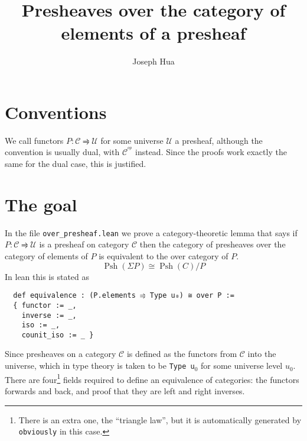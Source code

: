 \documentclass{article}
\DeclareMathOperator{\PSh}{Psh}
\newcommand{\functor}{\rightrightharpoons}
\newcommand{\CC}{\mathcal{C}}
\newcommand{\UU}{\mathcal{U}}
\newcommand{\op}{^{op}}
\newcommand{\iso}{\cong}
\newcommand{\<}{\langle}
\renewcommand{\>}{\rangle}
\theoremstyle{definitionstyle}
\theoremstyle{exercisestyle}
\theoremstyle{remarkstyle}
\begin{document}
\title{Presheaves over the category of elements of a presheaf}
\author{Joseph Hua}
\maketitle

\section{Conventions}

We call functors $P : \CC \functor \UU$ for some universe $\UU$
a presheaf, although the convention is usually dual, with $\CC^{\op}$ instead.
Since the proofs work exactly the same for the dual case, this is justified.

\section{The goal}

In the file \texttt{over\_presheaf.lean} we prove a category-theoretic lemma
that says if $P : \CC \functor \UU$ is a presheaf on category $\CC$ then
the category of presheaves over the category of elements of $P$ is equivalent
to the over category of $P$.
\[ \PSh(\Sigma P) \iso \PSh(C) / P \]
In lean this is stated as

\begin{lstlisting}
  def equivalence : (P.elements ⥤ Type u₀) ≅ over P :=
  { functor := _,
    inverse := _,
    iso := _,
    counit_iso := _ } \end{lstlisting}

Since presheaves on a category $\CC$ is defined as the functors
from $\CC$ into the universe, which in type theory is taken to be
\texttt{Type u}$_{0}$ for some universe level $u_{0}$.
There are four\footnote{There is an extra one, the ``triangle law'',
  but it is automatically generated by \texttt{obviously} in this case.}
fields required to define an equivalence of
categories: the functors forwards and back, and proof that they are left and
right inverses.
\end{document}
